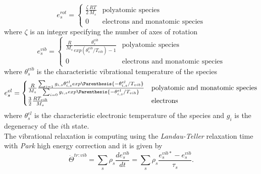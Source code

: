 \begin{equation}\label{eq:nemoRotationalSpeciesEnergy}
    e^{rot}_s = \begin{cases}
        \frac{\zeta}{2}\frac{R T}{M_s} & \text{polyatomic species} \\
        0 & \text{electrons and monatomic species}
    \end{cases}
\end{equation}
where $\zeta$ is an integer specifying the number of axes of rotation
\begin{equation}\label{eq:nemoVibrationalSpeciesEnergy}
    e^{vib}_s = \begin{cases}
        \frac{R}{M_s}\frac{\theta_s^{vib}}{exp(\theta_s^{vib}/T_{vib}) -1}  & \text{polyatomic species} \\
        0 & \text{electrons and monatomic species}
    \end{cases}
\end{equation}
where $\theta_s^{vib}$ is the characteristic vibrational temperature of the
species
\begin{equation}\label{eq:nemoElectronicSpeciesEnergy}
    e^{el}_s = \begin{cases}
        \frac{R}{M_s}\frac{\sum_{i=1} g_{i,s}\theta_{i,s}^{el}exp\Parenthesis{
            -\theta_{i,s}^{el}/T_{vib}}}{\sum_{i=0}g_{i,s}exp\Parenthesis{-\theta_{i,s}^{el}/T_{vib}}}  &
        \text{polyatomic and monatomic species} \\
        \frac{3}{2}\frac{RT_{vib}}{M_s} & \text{electrons}
    \end{cases}
\end{equation}
where $\theta_s^{el}$ is the characteristic electronic temperature of the
species and $g_i$ is the degeneracy of the $i$th state. \\

The vibrational relaxation is computing using the \textit{Landau-Teller}
relaxation time with \textit{Park}\cite{Park1989} high energy correction and it
is given by
\begin{equation}\label{eq:vibrationalRelaxation}
    \dot{\Theta}^{tr:vib} = \sum_s \rho_s \frac{de_s^{vib}}{dt} =
    \sum_s\rho_s\frac{e_s^{vib*} - e_s^{vib}}{\tau_s}.
\end{equation}
